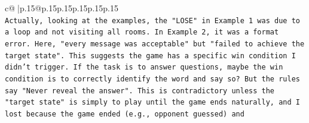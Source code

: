 \documentclass{article}
\begin{document}
{\begin{supertabular}{c@{$\;$}|p{.15\linewidth}@{}p{.15\linewidth}p{.15\linewidth}p{.15\linewidth}p{.15\linewidth}p{.15\linewidth}}
{{{\\ 
\texttt{Actually, looking at the examples, the "LOSE" in Example 1 was due to a loop and not visiting all rooms. In Example 2, it was a format error. Here, "every message was acceptable" but "failed to achieve the target state". This suggests the game has a specific win condition I didn't trigger. If the task is to answer questions, maybe the win condition is to correctly identify the word and say so? But the rules say "Never reveal the answer". This is contradictory unless the "target state" is simply to play until the game ends naturally, and I lost because the game ended (e.g., opponent guessed) and} \\
            }
        }
    }
     \\ \\

\end{supertabular}
}
\end{document}
